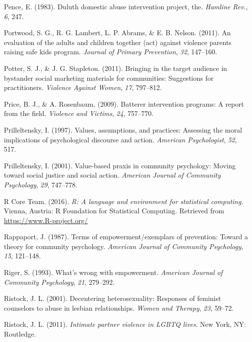 \documentclass[11pt,]{tufte-book}
\begin{document}
\hypertarget{ref-pence1983duluth}{}
Pence, E. (1983). Duluth domestic abuse intervention project, the.
\emph{Hamline Rev.}, \emph{6}, 247.

\hypertarget{ref-portwood2011evaluation}{}
Portwood, S. G., R. G. Lambert, L. P. Abrams, \& E. B. Nelson. (2011).
An evaluation of the adults and children together (act) against violence
parents raising safe kids program. \emph{Journal of Primary Prevention},
\emph{32}, 147--160.

\hypertarget{ref-potter2011bringing}{}
Potter, S. J., \& J. G. Stapleton. (2011). Bringing in the target
audience in bystander social marketing materials for communities:
Suggestions for practitioners. \emph{Violence Against Women}, \emph{17},
797--812.

\hypertarget{ref-price2009batterer}{}
Price, B. J., \& A. Rosenbaum. (2009). Batterer intervention programs: A
report from the field. \emph{Violence and Victims}, \emph{24}, 757--770.

\hypertarget{ref-prilleltensky1997values}{}
Prilleltensky, I. (1997). Values, assumptions, and practices: Assessing
the moral implications of psychological discourse and action.
\emph{American Psychologist}, \emph{52}, 517.

\hypertarget{ref-prilleltensky2001value-based}{}
Prilleltensky, I. (2001). Value-based praxis in community psychology:
Moving toward social justice and social action. \emph{American Journal
of Community Psychology}, \emph{29}, 747--778.

\hypertarget{ref-R-base}{}
R Core Team. (2016). \emph{R: A language and environment for statistical
computing}. Vienna, Austria: R Foundation for Statistical Computing.
Retrieved from \url{https://www.R-project.org/}

\hypertarget{ref-rappaport1987terms}{}
Rappaport, J. (1987). Terms of empowerment/exemplars of prevention:
Toward a theory for community psychology. \emph{American Journal of
Community Psychology}, \emph{15}, 121--148.

\hypertarget{ref-riger1993what}{}
Riger, S. (1993). What's wrong with empowerment. \emph{American Journal
of Community Psychology}, \emph{21}, 279--292.

\hypertarget{ref-ristock2001decentering}{}
Ristock, J. L. (2001). Decentering heterosexuality: Responses of
feminist counselors to abuse in lesbian relationships. \emph{Women and
Therapy}, \emph{23}, 59--72.

\hypertarget{ref-ristock2011intimate}{}
Ristock, J. L. (2011). \emph{Intimate partner violence in LGBTQ lives}.
New York, NY: Routledge.
\end{document}
